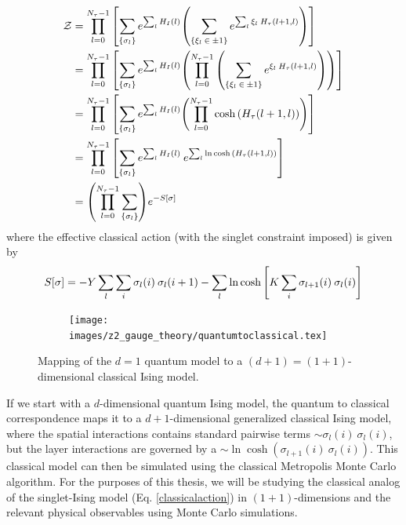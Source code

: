 \documentclass[../thesis_main.tex]{subfiles}
\begin{document}
\begin{align}
    \mathcal{Z} & = \prod_{l=0}^{N_\tau-1} \qty[\sum_{\{\sigma_l\}} e^{\sum_l H_I(l)} \qty( \sum_{\{\xi_l \: \in \: \pm 1\} } e^{\sum_l \xi_l \: H_\tau(l+1, l)})] \nonumber \\
    & = \prod_{l=0}^{N_\tau-1} \qty[\sum_{\{\sigma_l\}} e^{\sum_l H_I(l)} \qty( \prod_{l=0}^{N_\tau - 1} \qty(\sum_{\{\xi_l \: \in \: \pm 1\} } e^{\xi_l \: H_\tau(l+1, l)}))]   \nonumber \\
    & = \prod_{l=0}^{N_\tau-1} \qty[\sum_{\{\sigma_l\}} e^{\sum_l H_I(l)} \qty( \prod_{l=0}^{N_\tau - 1} \cosh \qty(H_\tau(l+1, l)))]   \nonumber \\
    & = \prod_{l=0}^{N_\tau-1} \qty[\sum_{\{\sigma_l\}} e^{\sum_l H_I(l)} \: e^{\sum_l \ln \cosh \qty(H_\tau(l+1, l))}]   \nonumber \\
    & = \qty(\prod_{l=0}^{N_\tau-1} \sum_{\{\sigma_l\}}) e^{-S[\sigma]}
\end{align}
\endgroup
where the effective classical action (with the singlet constraint imposed) is given by
\begin{equation}
    S[\sigma] = -Y\sum_l \sum_i \sigma_l(i) \: \sigma_l(i+1) - \sum_l \ln \cosh \qty[K \sum_i \sigma_{l+1}(i) \: \sigma_{l}(i)]
    \label{classicalaction}
\end{equation} 
\begin{figure}[t!]
    \centering
    \begin{subfigure}[b]{0.8\textwidth}  %
        \centering
        \texttt{[image: images/z2\_gauge\_theory/quantumtoclassical.tex]}
    \end{subfigure}
    \caption{Mapping of the $d=1$ quantum model to a $(d+1) = (1+1)$-dimensional classical Ising model.}
    \label{}
\end{figure}
If we start with a $d$-dimensional quantum Ising model, the quantum to classical correspondence maps it to a $d+1$-dimensional generalized classical Ising model, where the spatial interactions contains standard pairwise terms $\sim \sigma_l(i) \: \sigma_l(i)$, but the layer interactions are governed by a $\sim \ln \cosh (\sigma_{l+1}(i) \: \sigma_{l}(i))$. This classical model can then be simulated using the classical Metropolis Monte Carlo algorithm. For the purposes of this thesis, we will be studying the classical analog of the singlet-Ising model (Eq. \eqref{classicalaction}) in $(1 + 1)$-dimensions and the relevant physical observables using Monte Carlo simulations.
\end{document}
